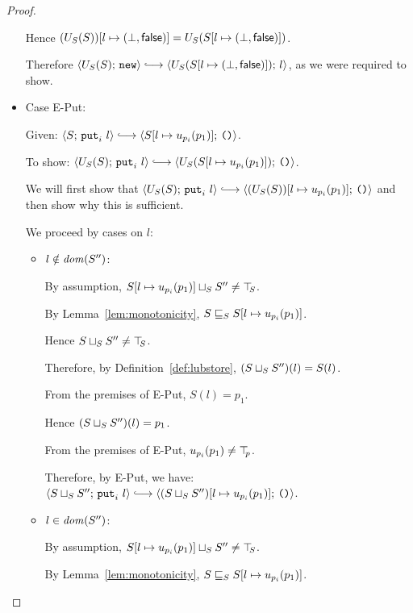 \begin{proof}
\begin{itemize}
      Hence $(U_S(S))[l \mapsto (\bot, \textsf{false})] =
      U_S(S[l \mapsto (\bot, \textsf{false})])$.

      Therefore $\config{U_S(S)}{\NEW} \parstepsto
      \config{U_S(\extS{S}{l}{\bot}{\frozenfalse})}{l}$, as we were
      required to show.

    \item Case {\sc E-Put}:

      Given: $\config{S}{\putiexp{l}} \parstepsto
      \config{\extSRaw{S}{l}{u_{p_i}(p_1)}}{\unit}$.

      To show: $\config{U_S(S)}{\putiexp{l}} \parstepsto
      \config{U_S(\extSRaw{S}{l}{u_{p_i}(p_1)})}{\unit}$.

      We will first show that $\config{U_S(S)}{\putiexp{l}}
      \parstepsto \config{\extSRaw{(U_S(S))}{l}{u_{p_i}(p_1)}}{\unit}$
      and then show why this is sufficient.


      We proceed by cases on $l$:

      \begin{itemize}
        \item $l \notin \mathit{dom}(S'')$:

          By assumption, $S[l \mapsto u_{p_i}(p_1)] \sqcup_{S} S''
          \neq \top\hspace{-0.85mm}_{S}$.

          By Lemma~\ref{lem:monotonicity},
          $S \sqsubseteq_S S[l \mapsto u_{p_i}(p_1)]$.

          Hence $S \sqcup_{S} S'' \neq \top\hspace{-0.85mm}_{S}$.

          Therefore, by Definition~\ref{def:lubstore},
          $(S \sqcup_{S} S'')(l) = S(l)$.

          From the premises of {\sc E-Put}, $S(l) = p_1$.

          Hence $(S \sqcup_{S} S'')(l) = p_1$.

          From the premises of {\sc E-Put}, $u_{p_i}(p_1) \neq \top\hspace{-0.85mm}_{p}$.

          Therefore, by {\sc E-Put}, we have:
          $\config{\lubstore{S}{S''}}{\putiexp{l}} \parstepsto
          \config{\extSRaw{(\lubstore{S}{S''})}{l}{u_{p_i}(p_1)}}{\unit}$.

        \item $l \in \mathit{dom}(S'')$:

          By assumption, $S[l \mapsto u_{p_i}(p_1)] \sqcup_{S} S'' \neq
          \top\hspace{-0.85mm}_{S}$.

          By Lemma~\ref{lem:monotonicity},
          $S \sqsubseteq_S S[l \mapsto u_{p_i}(p_1)]$.


\end{itemize}
\end{itemize}
\end{proof}
